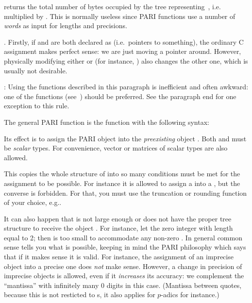  returns the total number of bytes occupied
by the tree representing~, i.e.~ multiplied by
. This is normally useless since PARI functions use
a number of \emph{words} as input for lengths and precisions.

.
Firstly, if  and  are both declared as  (i.e.~pointers
to something), the ordinary C assignment  makes perfect sense: we
are just moving a pointer around. However, physically modifying either
 or  (for instance, ) also changes the other
one, which is usually not desirable. \label{se:assign}

: Using the functions described in this
paragraph is inefficient and often awkward: one of the 
functions (see~) should be preferred. See the paragraph
end for one exception to this rule.

\noindent
The general PARI  function is the function  with
the following syntax:


\noindent
Its effect is to assign the PARI object  into the \emph{preexisting}
object . Both  and  must be \emph{scalar} types. For
convenience, vector or matrices of scalar types are also allowed.

This copies the whole structure of  into  so many conditions
must be met for the assignment to be possible. For instance it is allowed to
assign a  into a , but the converse is forbidden. For
that, you must use the truncation or rounding function of your choice,
e.g..

It can also happen that  is not large enough or does not have the proper
tree structure to receive the object . For instance, let  the zero
integer with length equal to 2; then  is too small to accommodate any
non-zero . In general common sense tells you what is possible, keeping in
mind the PARI philosophy which says that if it makes sense it is valid. For
instance, the assignment of an imprecise object into a precise one does \emph{not}
make sense. However, a change in precision of imprecise objects is allowed, even
if it \emph{increases} its accuracy: we complement the ``mantissa'' with
infinitely many $0$ digits in this case. (Mantissa between quotes, because this
is not resticted to s, it also applies for $p$-adics for instance.)

